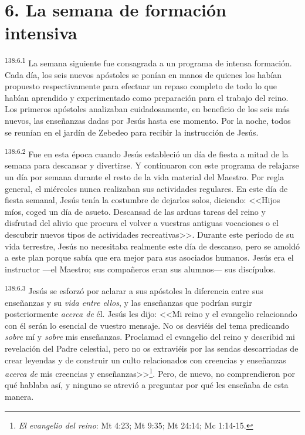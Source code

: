 \section*{6. La semana de formación intensiva}
\par 
\textsuperscript{138:6.1} La semana siguiente fue consagrada a un programa de intensa formación. Cada día, los seis nuevos apóstoles se ponían en manos de quienes los habían propuesto respectivamente para efectuar un repaso completo de todo lo que habían aprendido y experimentado como preparación para el trabajo del reino. Los primeros apóstoles analizaban cuidadosamente, en beneficio de los seis más nuevos, las enseñanzas dadas por Jesús hasta ese momento. Por la noche, todos se reunían en el jardín de Zebedeo para recibir la instrucción de Jesús.

\par 
\textsuperscript{138:6.2} Fue en esta época cuando Jesús estableció un día de fiesta a mitad de la semana para descansar y divertirse. Y continuaron con este programa de relajarse un día por semana durante el resto de la vida material del Maestro. Por regla general, el miércoles nunca realizaban sus actividades regulares. En este día de fiesta semanal, Jesús tenía la costumbre de dejarlos solos, diciendo: <<Hijos míos, coged un día de asueto. Descansad de las arduas tareas del reino y disfrutad del alivio que procura el volver a vuestras antiguas vocaciones o el descubrir nuevos tipos de actividades recreativas>>. Durante este período de su vida terrestre, Jesús no necesitaba realmente este día de descanso, pero se amoldó a este plan porque sabía que era mejor para sus asociados humanos. Jesús era el instructor ---el Maestro; sus compañeros eran sus alumnos--- sus discípulos.

\par 
\textsuperscript{138:6.3} Jesús se esforzó por aclarar a sus apóstoles la diferencia entre sus enseñanzas y su \textit{vida entre ellos}, y las enseñanzas que podrían surgir posteriormente \textit{acerca de} él. Jesús les dijo: <<Mi reino y el evangelio relacionado con él serán lo esencial de vuestro mensaje. No os desviéis del tema predicando \textit{sobre} mí y \textit{sobre} mis enseñanzas. Proclamad el evangelio del reino y describid mi revelación del Padre celestial, pero no os extraviéis por las sendas descarriadas de crear leyendas y de construir un culto relacionados con creencias y enseñanzas \textit{acerca de} mis creencias y enseñanzas>>\footnote{\textit{El evangelio del reino}: Mt 4:23; Mt 9:35; Mt 24:14; Mc 1:14-15.}. Pero, de nuevo, no comprendieron por qué hablaba así, y ninguno se atrevió a preguntar por qué les enseñaba de esta manera.

